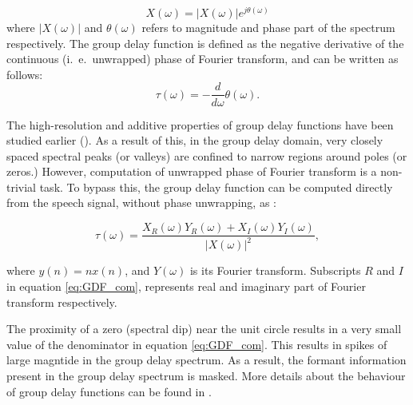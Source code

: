 \documentclass[conference]{IEEEtran}
\begin{document}
\begin{equation}
X(\omega) = |X(\omega)| e^{j\theta(\omega)} 
\label{equ:FT}
\end{equation}     
where $|X(\omega)|$ and $\theta(\omega)$ refers to magnitude and phase part of
the spectrum respectively. The group delay function is defined as the
negative derivative of the continuous (i.~e.~unwrapped) phase of Fourier transform, and can be written
as follows: 
\begin{equation}
\tau(\omega) =  - \frac{d}{d\omega} \theta(\omega).
\label{equ:GDF_def}
\end{equation}

The high-resolution and additive properties of group delay functions have been
studied earlier (\cite{yegnaJASA, gdSurvey}). As a result of this, in the
group delay domain, very closely
spaced spectral peaks (or valleys) are confined to narrow regions around poles
(or zeros.) However, computation of unwrapped phase of Fourier transform is a
non-trivial task. To bypass this, the group delay function can be computed
directly from the speech signal, without phase unwrapping, as
\cite{gdDerivationIcassp}:

\begin{equation}
\tau(\omega) = \frac{X_R(\omega)Y_R(\omega) +
X_I(\omega)Y_I(\omega)}{|X(\omega)|^{2}},
\label{eq:GDF_com}
\end{equation}

where $y(n) = n x(n)$, and $Y(\omega)$ is its Fourier transform. 
Subscripts $R$ and $I$ in equation \ref{eq:GDF_com}, represents real and
imaginary part of Fourier transform respectively. 

The proximity of a zero (spectral dip) near the
unit circle results in a very small value of the denominator in
equation \ref{eq:GDF_com}. This results in spikes of large magntide in the group
delay spectrum. As a result, the formant information present in the group delay
spectrum is masked. More details about the behaviour of group delay functions
can be found in \cite{gdSurvey}.
\end{document}

